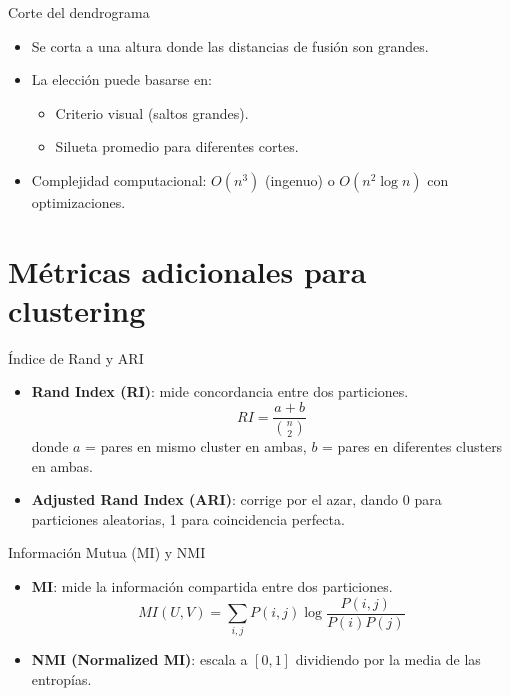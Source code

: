 \documentclass[aspectratio=169, 10pt, xcolor=table]{beamer}
\begin{document}
\begin{frame}{Corte del dendrograma}
    \begin{itemize}
        \item Se corta a una altura donde las distancias de fusión son grandes.
        \item La elección puede basarse en:
        \begin{itemize}
            \item Criterio visual (saltos grandes).
            \item Silueta promedio para diferentes cortes.
        \end{itemize}
        \item Complejidad computacional: $O(n^3)$ (ingenuo) o $O(n^2 \log n)$ con optimizaciones.
    \end{itemize}
\end{frame}

\section{Métricas adicionales para clustering}

\begin{frame}{Índice de Rand y ARI}
    \begin{itemize}
        \item \textbf{Rand Index (RI)}: mide concordancia entre dos particiones.
        \[
        RI = \frac{a+b}{\binom{n}{2}}
        \]
        donde $a$ = pares en mismo cluster en ambas, $b$ = pares en diferentes clusters en ambas.
        \item \textbf{Adjusted Rand Index (ARI)}: corrige por el azar, dando 0 para particiones aleatorias, 1 para coincidencia perfecta.
    \end{itemize}
\end{frame}

\begin{frame}{Información Mutua (MI) y NMI}
    \begin{itemize}
        \item \textbf{MI}: mide la información compartida entre dos particiones.
        \[
        MI(U,V) = \sum_{i,j} P(i,j) \log \frac{P(i,j)}{P(i)P(j)}
        \]
        \item \textbf{NMI (Normalized MI)}: escala a $[0,1]$ dividiendo por la media de las entropías.
    \end{itemize}
\end{frame}
\end{document}
